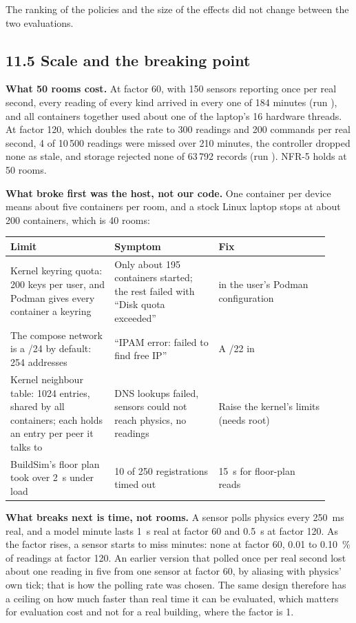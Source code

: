 The ranking of the policies and the size of the effects did not change between
the two evaluations.

\subsection{11.5 Scale and the breaking point}

\textbf{What 50 rooms cost.} At factor 60, with 150 sensors reporting once per
real second, every reading of every kind arrived in every one of 184 minutes
(run ), and all containers together used about one of
the laptop's 16 hardware threads. At factor 120, which doubles the rate to 300
readings and 200 commands per real second, 4 of 10\,500 \COtwo{} readings were
missed over 210 minutes, the controller dropped none as stale, and storage
rejected none of 63\,792 records (run ). NFR-5 holds at 50 rooms.

\textbf{What broke first was the host, not our code.} One container per device
means about five containers per room, and a stock Linux laptop stops at about
200 containers, which is 40 rooms:

\begin{longtable}[]{@{}L{0.30\linewidth}L{0.30\linewidth}L{0.32\linewidth}@{}}
\toprule
\textbf{Limit} & \textbf{Symptom} & \textbf{Fix} \\
\midrule
\endhead
Kernel keyring quota: 200 keys per user, and Podman gives every container a keyring & Only about 195 containers started; the rest failed with ``Disk quota exceeded'' &  in the user's Podman configuration \\
The compose network is a /24 by default: 254 addresses & ``IPAM error: failed to find free IP'' & A /22 in  \\
Kernel neighbour table: 1024 entries, shared by all containers; each holds an entry per peer it talks to & DNS lookups failed, sensors could not reach physics, no readings & Raise the kernel's  limits (needs root) \\
BuildSim's floor plan took over 2~s under load & 10 of 250 registrations timed out & 15~s for floor-plan reads \\
\bottomrule
\end{longtable}

\textbf{What breaks next is time, not rooms.} A sensor polls physics every
250~ms real, and a model minute lasts 1~s real at factor 60 and 0.5~s at factor
120. As the factor rises, a sensor starts to miss minutes: none at factor 60,
0.01 to 0.10~\% of readings at factor 120. An earlier version that polled once
per real second lost about one reading in five from one sensor at factor 60,
by aliasing with physics' own tick; that is how the polling rate was chosen.
The same design therefore has a ceiling on how much faster than real time it
can be evaluated, which matters for evaluation cost and not for a real
building, where the factor is 1.

